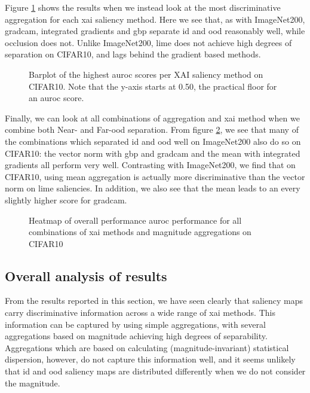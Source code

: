\documentclass[UKenglish]{uiomasterthesis} %
\theoremstyle{definition}
\begin{document}
Figure \ref{fig:cifar10_all_generators_barplot} shows the results when we instead look at the most discriminative aggregation for each \ac{xai} saliency method. Here we see that, as with ImageNet200, \ac{gradcam}, integrated gradients and \ac{gbp} separate \ac{id} and \ac{ood} reasonably well, while occlusion does not. Unlike ImageNet200, \ac{lime} does not achieve high degrees of separation on CIFAR10, and lags behind the gradient based methods.

\begin{figure}[h]
    \begin{center}
        
    \end{center}
    \caption[Highest AUROC score for each XAI saliency method on CIFAR10]{Barplot of the highest \ac{auroc} scores per XAI saliency method on CIFAR10. Note that the y-axis starts at 0.50, the practical floor for an \ac{auroc} score.}
    \label{fig:cifar10_all_generators_barplot}
\end{figure}

Finally, we can look at all combinations of aggregation and \ac{xai} method when we combine both Near- and Far-\ac{ood} separation. From figure \ref{fig:cifar10_heatmap}, we see that many of the combinations which separated \ac{id} and \ac{ood} well on ImageNet200 also do so on CIFAR10: the vector norm with \ac{gbp} and \ac{gradcam} and the mean with integrated gradients all perform very well. Contrasting with ImageNet200, we find that on CIFAR10, using mean aggregation is actually more discriminative than the vector norm on \ac{lime} saliencies. In addition, we also see that the mean leads to an every slightly higher score for \ac{gradcam}.

\begin{figure}[hbtp]
    \begin{center}
        
    \end{center}
    \caption[Overall performance on CIFAR10]{Heatmap of overall performance \ac{auroc} performance for all combinations of \ac{xai} methods and magnitude aggregations on CIFAR10}
    \label{fig:cifar10_heatmap}
\end{figure}

\subsection{Overall analysis of results}

From the results reported in this section, we have seen clearly that saliency maps carry discriminative information across a wide range of \ac{xai} methods. This information can be captured by using simple aggregations, with several aggregations based on magnitude achieving high degrees of separability. Aggregations which are based on calculating (magnitude-invariant) statistical dispersion, however, do not capture this information well, and it seems unlikely that \ac{id} and \ac{ood} saliency maps are distributed differently when we do not consider the magnitude.
\end{document}

